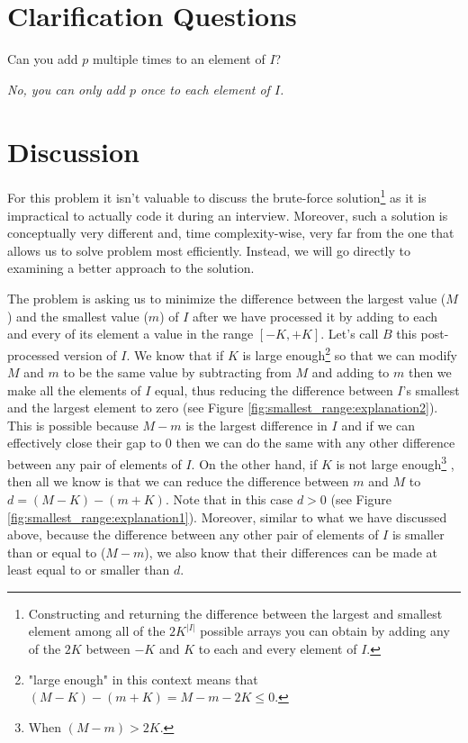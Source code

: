 \section{Clarification Questions}

\begin{QandA}
	\item \begin{questionitem} \begin{question} Can you add $p$ multiple times to an element of $I$?  \end{question} 	 
    \begin{answered}
		\textit{No, you can only add $p$ once to each element of $I$.}
	\end{answered} \end{questionitem}	
\end{QandA}

\section{Discussion}
\label{smallest_range:sec:discussionMain}
For this problem it isn't valuable to discuss the brute-force solution\footnote{Constructing
	and returning the difference between the largest and smallest element among all of the
	$2K^{|I|}$ possible arrays you can obtain by adding any of the $2K$ between $-K$ and $K$ to each
	and every element of $I$.} as it is impractical to actually code it during an interview.
	Moreover, such a solution is conceptually very different and,  time complexity-wise, very far from the one that allows us to solve problem most efficiently. Instead, we will go directly to examining a better approach to the solution. 
	

The problem is asking us to minimize the difference between the largest value ($M$) and the smallest
value ($m$) of $I$ after we have processed it by adding to each and every of its element a value in
the range $[-K,+K]$. Let's call $B$ this post-processed version of $I$. We know that if $K$ is large
enough\footnote{ "large enough" in this context means that $(M-K) - (m+K) = M-m-2K \leq 0$.} so
that we can modify $M$ and $m$ to be the same value by subtracting from $M$ and adding to $m$ then
we make all the elements of $I$ equal, thus reducing the difference between $I$'s smallest and the
largest element to zero (see Figure \ref{fig:smallest_range:explanation2}). This is possible because
$M-m$ is the  largest difference in $I$ and if we can effectively close their gap to $0$ then we can
do the same with any other difference between any pair of elements of $I$. On the other hand, if $K$
is not large enough\footnote{When $(M-m) > 2K$.} , then all we know is that we can reduce the
difference between $m$ and $M$ to $d=(M-K)-(m+K)$. Note that in this case $d > 0$  (see Figure
\ref{fig:smallest_range:explanation1}). Moreover, similar to what we have discussed above, because
the difference between any other pair of elements of $I$ is smaller than or equal to ($M-m$), we also
know that their differences can be made at least equal to or smaller than $d$.


